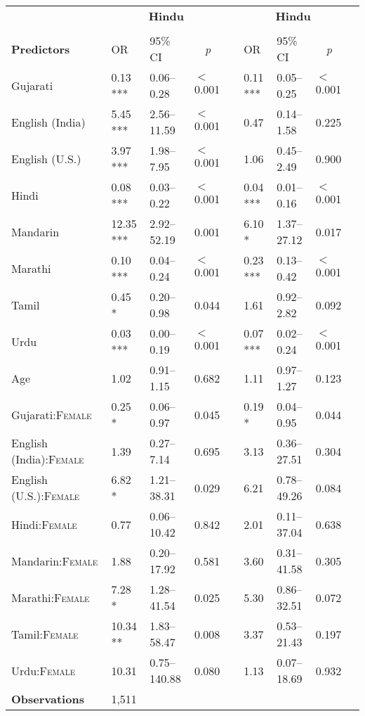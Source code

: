 \begin{table}[ht]
\begin{threeparttable}
\begin{tabular}{lllllllll}
& \multicolumn{3}{c}{\textbf{Hindu}\tnote{a}} & & \multicolumn{3}{c}{\textbf{Hindu}\tnote{a}}\\
\cline{2-4} \cline{6-8} \\[-.75em]
\textbf{Predictors} & OR & 95\% CI & \multicolumn{1}{c}{\textit{p}} & & OR & 95\% CI & \multicolumn{1}{c}{\textit{p}} \\ 
\midrule
 Gujarati & 0.13 *** & 0.06--0.28 & $<$0.001 &  & 0.11 *** & 0.05--0.25 & $<$0.001 \\ 
 English (India) & 5.45 *** & 2.56--11.59 & $<$0.001 &  & 0.47 & 0.14--1.58 & 0.225 \\ 
 English (U.S.) & 3.97 *** & 1.98--7.95 & $<$0.001 &  & 1.06 & 0.45--2.49 & 0.900 \\ 
 Hindi & 0.08 *** & 0.03--0.22 & $<$0.001 &  & 0.04 *** & 0.01--0.16 & $<$0.001 \\ 
 Mandarin & 12.35 *** & 2.92--52.19 & 0.001 &  & 6.10 * & 1.37--27.12 & 0.017 \\ 
 Marathi & 0.10 *** & 0.04--0.24 & $<$0.001 &  & 0.23 *** & 0.13--0.42 & $<$0.001 \\ 
 Tamil & 0.45 * & 0.20--0.98 & 0.044 &  & 1.61 & 0.92--2.82 & 0.092 \\ 
 Urdu & 0.03 *** & 0.00--0.19 & $<$0.001 &  & 0.07 *** & 0.02--0.24 & $<$0.001 \\ 
 Age\tnote{b} & 1.02 & 0.91--1.15 & 0.682 &  & 1.11 & 0.97--1.27 & 0.123 \\ 
 Gujarati:\textsc{Female} & 0.25 * & 0.06--0.97 & 0.045 &  & 0.19 * & 0.04--0.95 & 0.044 \\
 English (India):\textsc{Female} & 1.39 & 0.27--7.14 & 0.695 &  & 3.13 & 0.36--27.51 & 0.304 \\ 
 English (U.S.):\textsc{Female} & 6.82 * & 1.21--38.31 & 0.029 &  & 6.21 & 0.78--49.26 & 0.084 \\ 
 Hindi:\textsc{Female} & 0.77 & 0.06--10.42 & 0.842 &  & 2.01 & 0.11--37.04 & 0.638 \\ 
 Mandarin:\textsc{Female} & 1.88 & 0.20--17.92 & 0.581 &  & 3.60 & 0.31--41.58 & 0.305 \\ 
 Marathi:\textsc{Female} & 7.28 * & 1.28--41.54 & 0.025 &  & 5.30 & 0.86--32.51 & 0.072 \\ 
 Tamil:\textsc{Female} & 10.34 ** & 1.83--58.47 & 0.008 &  & 3.37 & 0.53--21.43 & 0.197 \\ 
 Urdu:\textsc{Female} & 10.31 & 0.75--140.88 & 0.080 &  & 1.13 & 0.07--18.69 & 0.932 \\ 
 \midrule
\textbf{Observations}\tnote{c} & 1,511  &  &  &  &  &  &  \\

\end{tabular}
\end{threeparttable}
\end{table}
